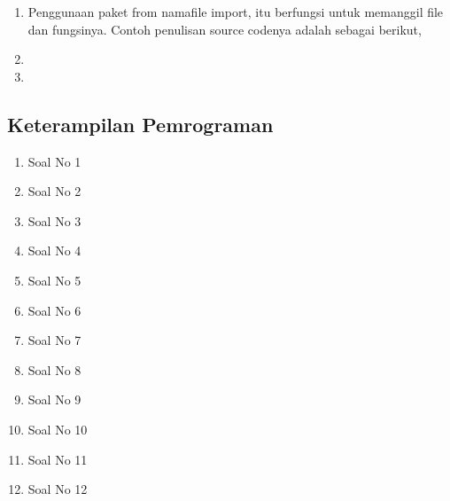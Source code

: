 \begin{enumerate}
\item  Penggunaan paket from namafile import, itu berfungsi untuk memanggil file dan fungsinya. Contoh penulisan source codenya adalah sebagai berikut,
	

\item  

\item 
\end{enumerate}

\subsection{Keterampilan Pemrograman}
\begin{enumerate}

\item Soal No 1 

\item Soal No 2 

\item Soal No 3 

\item Soal No 4 

\item Soal No 5 

\item Soal No 6 

\item Soal No 7 

\item Soal No 8 

\item Soal No 9 

\item Soal No 10 

\item Soal No 11 

\item Soal No 12 
\end{enumerate}

